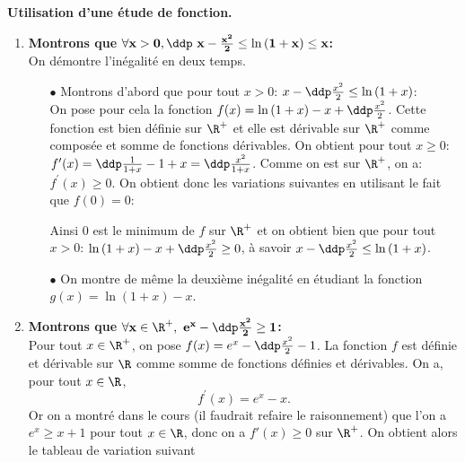 \begin{correction}  \; \textbf{Utilisation d'une \'etude de fonction.}\\
\begin{enumerate}
\item \textbf{Montrons que $\mathbf{\forall x>0,\ddp\ x-\frac{x^2}{2}\leq \ln{(1+x)}\leq x}$:}\\
\noindent On d\'emontre l'in\'egalit\'e en deux temps.
\begin{itemize}
\item[$\bullet$] Montrons d'abord que pour tout $x>0$: $x-\ddp\frac{x^2}{2}\leq \ln{(1+x)}$:\\
\noindent On pose pour cela la fonction $f(x)=\ln{(1+x)}-x+\ddp\frac{x^2}{2}$. Cette fonction est bien d\'efinie sur $\R^{+}$ et elle est d\'erivable sur $\R^{+}$ comme compos\'ee et somme de fonctions d\'erivables. On obtient pour tout $x\geq  0$: $f^{\prime}(x)=\ddp\frac{1}{1+x}-1+x=\ddp\frac{x^2}{1+x}$. Comme on est sur $\R^{+}$, on a: $f^{\prime}(x)\geq 0$. On obtient donc les variations suivantes en utilisant le fait que $f(0)=0$: 
\begin{center}
\end{center}
Ainsi $0$ est le minimum de $f$ sur $\R^{+}$ et on obtient bien que pour tout $x>0$: $\ln{(1+x)}-x+\ddp\frac{x^2}{2}\geq 0$, \`{a} savoir $x-\ddp\frac{x^2}{2} \leq \ln{(1+x)}$.
\item[$\bullet$] On montre de m\^eme la deuxi\`eme in\'egalit\'e en \'etudiant la fonction $g(x)=\ln{(1+x)}-x$.
\end{itemize}
\item \textbf{Montrons que $\mathbf{\forall x\in\R^+,\ e^x - \ddp \frac{x^2}{2}\geq 1}$:}\\
\noindent Pour tout $x\in\R^+$, on pose $f(x)=e^x-\ddp \frac{x^2}{2}-1$. La fonction $f$ est d\'efinie et d\'erivable sur $\R$ comme somme de fonctions d\'efinies et d\'erivables. On a, pour tout $x\in\R$,
$$f^{\prime}(x)=e^x-x.$$
Or on a montr\'e dans le cours (il faudrait refaire le raisonnement) que l'on a $e^x \geq x+1$ pour tout $x \in \R$, donc on a $f'(x) \geq 0$ sur $\R^+$. On obtient alors le tableau de variation suivant
\begin{center}

\end{center}
\end{enumerate}
\end{correction}
